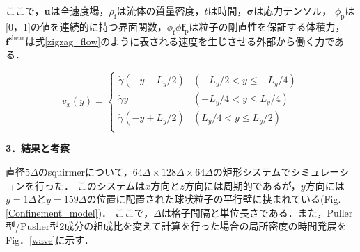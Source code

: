 \documentclass[twocolumns,10pt,a4j]{jarticle}
\begin{document}
  \noindent
ここで，$\boldsymbol{u}$は全速度場，$\rho_\mathrm{f}$は流体の質量密度，$t$は時間，$\boldsymbol{\sigma}$は応力テンソル，
$\phi_\mathrm{p}$は[0，1]の値を連続的に持つ界面関数，$\phi_\mathrm{f} \phi \boldsymbol{f}_\mathrm{p}$は粒子の剛直性を保証する体積力，
$\boldsymbol{f}^\mathrm{shear}$は式\eqref{zigzag_flow}のように表される速度を生じさせる外部から働く力である．
  \par
  \vspace{-4truemm}
  \begin{equation}
    v_x(y) =
    \begin{cases}
      \dot{\gamma} (-y - L_y/2) & (-L_y/2 < y \le -L_y/4) \\
      \dot{\gamma} y            & (-L_y/4 < y \le L_y/4) \\
      \dot{\gamma} (-y + L_y/2) & (L_y/4 < y \le L_y/2)\\
    \end{cases}
    \label{zigzag_flow}
  \end{equation}
  \vspace{-4truemm}


  \noindent
  {\bf \large 3．結果と考察}
  \par
直径$5\Delta$のsquirmerについて，$64\Delta \times 128\Delta \times 64\Delta$の矩形システムでシミュレーションを行った．
このシステムは$x$方向と$z$方向には周期的であるが，$y$方向には$y =1\Delta$と$y=159\Delta$の位置に配置された球状粒子の平行壁に挟まれている(Fig.\ref{Confinement_model})．
ここで，$\Delta$は格子間隔と単位長さである．また，Puller型/Pusher型2成分の組成比を変えて計算を行った場合の局所密度の時間発展をFig．\ref{wave}に示す．


\end{document}
